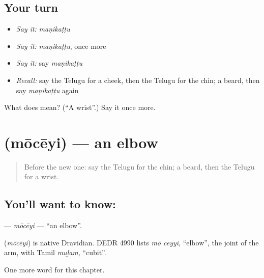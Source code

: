 \subsection*{Your turn}
\begin{itemize}
\raggedright
  \item \emph{Say it:} \emph{maṇikaṭṭu}
  \item \emph{Say it:} \emph{maṇikaṭṭu}, once more
  \item \emph{Say it:} say \emph{maṇikaṭṭu}
  \item \emph{Recall:} say the Telugu for a cheek, then the Telugu for the chin; a beard, then say \emph{maṇikaṭṭu} again
\end{itemize}

\begin{tcolorbox}[breakable,colback=teal!4,colframe=teal!35!black,title={Before you move on}]
What does  mean? (\textquotedblleft{}A wrist\textquotedblright{}.) Say it once more.
\end{tcolorbox}
\section[\texorpdfstring{\te{మోచేయి} (mōcēyi)}{మోచేయి (mōcēyi)}]{ (mōcēyi) — an elbow}

\label{lesson:TE-C128-moceyi}



\begin{quote}
Before the new one: say the Telugu for the chin; a beard, then the Telugu for a wrist.
\end{quote}

\subsection*{You'll want to know: }
\textbf{} — \emph{mōcēyi} — \textquotedblleft{}an elbow\textquotedblright{}.

\begin{cousinweb}
\textbf{} (\emph{mōcēyi}) is native Dravidian. DEDR 4990 lists \emph{mō ceyyi}, \textquotedblleft{}elbow\textquotedblright{}, the joint of the arm, with Tamil \emph{muḻam}, \textquotedblleft{}cubit\textquotedblright{}.
\end{cousinweb}

\begin{grammarlens}[title={What you've built}]
One more word for this chapter.
\end{grammarlens}

